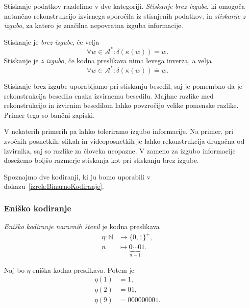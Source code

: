 \documentclass[fin1, tisk]{fmfdelo}
\newcommand{\N}{\mathbb{N}}
\newcommand{\A}{\mathcal{A}}
\theoremstyle{definition}
\begin{document}
Stiskanje podatkov razdelimo v dve kategoriji. \emph{Stiskanje brez izgube}, ki omogoča natančno
rekonstrukcijo izvirnega sporočila iz stisnjenih podatkov, in \emph{stiskanje z izgubo}, za katero
je značilna nepovratna izguba informacije.

\begin{definicija}
    Stiskanje je \emph{brez izgube}, če velja
    \[
        \forall w \in \A^* \colon \delta(\kappa(w)) = w.
    \]
    Stiskanje je \emph{z izgubo}, če kodna preslikava nima levega inverza,
    a velja
    \[
        \forall w \in \A^* \colon \delta(\kappa(w)) \doteq w.
    \]
\end{definicija}

Stiskanje brez izgube uporabljamo pri stiskanju besedil, saj je pomembno da je rekonstrukcija
besedila enaka izvirnemu besedilu. Majhne razlike med rekonstrukcijo in izvirnim besedilom 
lahko povzročijo velike pomenske razlike. Primer tega so bančni zapiski.

V nekaterih primerih pa lahko toleriramo izgubo informacije. Na primer, pri zvočnih posnetkih, 
slikah in videoposnetkih je lahko rekonstrukcija drugačna od izvirnika, saj so razlike za 
človeka neopazne. V zameno za izgubo informacije dosežemo boljšo razmerje stiskanja kot
pri stiskanju brez izgube.

Spoznajmo dve kodiranji, ki ju bomo uporabili v dokazu~\ref{izrek:BinarnoKodiranje}.

\subsubsection{Eniško kodiranje}

\begin{definicija}\label{def:eniška}%
    \emph{Eniško kodiranje naravnih števil} je kodna preslikava 
    \begin{align*}
        \eta \colon \N &\to \{ 0, 1 \}^+, \\
        n &\mapsto \underbrace{0 \cdots 0}_{n-1}1.
    \end{align*}
\end{definicija}

\begin{primer}
    Naj bo $\eta$ eniška kodna preslikava. Potem je
    \begin{align*}
        \eta(1) &= 1, \\
        \eta(2) &= 01, \\ 
        \eta(9) &= 000000001.
    \end{align*}
\end{primer}
\end{document}
